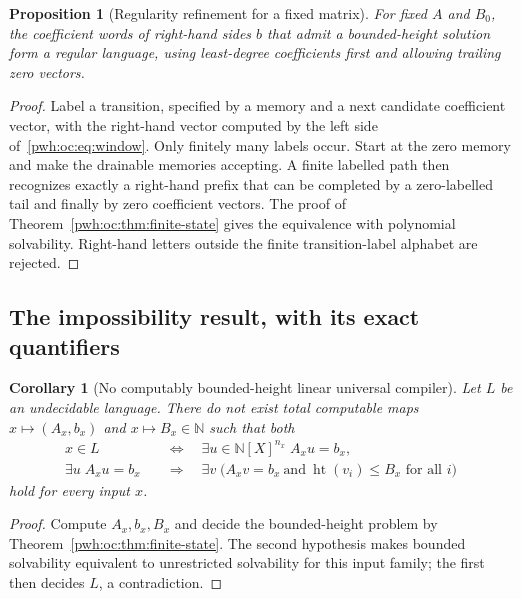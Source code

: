\documentclass[11pt,letterpaper]{article}
\numberwithin{equation}{section}
\newtheorem{proposition}[theorem]{Proposition}
\newtheorem{corollary}[theorem]{Corollary}
\theoremstyle{definition}
\newcommand{\N}{\mathbb N}
\newcommand{\htc}{\operatorname{ht}}
\begin{document}
\begin{proposition}[Regularity refinement for a fixed matrix]
\label{pwh:oc:prop:regular}
For fixed $A$ and $B_0$, the coefficient words of right-hand sides $b$ that
admit a bounded-height solution form a regular language, using
least-degree coefficients first and allowing trailing zero vectors.
\end{proposition}

\begin{proof}
Label a transition, specified by a memory and a next candidate coefficient
vector, with the right-hand vector computed by the left side
of~\eqref{pwh:oc:eq:window}. Only finitely many labels occur. Start at the zero
memory and make the drainable memories accepting. A finite labelled path
then recognizes exactly a right-hand prefix that can be completed by a
zero-labelled tail and finally by zero coefficient vectors. The proof of
Theorem~\ref{pwh:oc:thm:finite-state} gives the equivalence with polynomial
solvability. Right-hand letters outside the finite transition-label
alphabet are rejected.
\end{proof}

\subsection{The impossibility result, with its exact quantifiers}

\begin{corollary}[No computably bounded-height linear universal compiler]
\label{pwh:oc:cor:no-linear}
Let $L$ be an undecidable language. There do not exist total computable
maps $x\mapsto(A_x,b_x)$ and $x\mapsto B_x\in\N$ such that both
\begin{align*}
 x\in L &\quad\Longleftrightarrow\quad
           \exists u\in\N[X]^{n_x}\; A_xu=b_x,\\
 \exists u\;A_xu=b_x &\quad\Longrightarrow\quad
           \exists v\;\bigl(A_xv=b_x\ \text{and}\ \htc(v_i)\le B_x
           \text{ for all }i\bigr)
\end{align*}
hold for every input $x$.
\end{corollary}

\begin{proof}
Compute $A_x,b_x,B_x$ and decide the bounded-height problem by
Theorem~\ref{pwh:oc:thm:finite-state}. The second hypothesis makes bounded
solvability equivalent to unrestricted solvability for this input family;
the first then decides $L$, a contradiction.
\end{proof}
\end{document}
